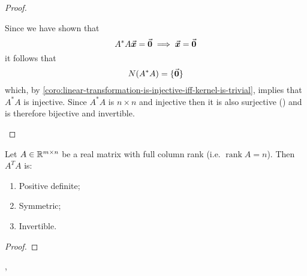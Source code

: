 \documentclass[../MathsNotesBase.tex]{subfiles}
\begin{document}
{\begin{proof}
\begin{enumerate}[label=(\roman*)]
{						
						Since we have shown that
						\[ A^* A \vec{\bm{x}} = \vec{\bm{0}} \implies \vec{\bm{x}} = \vec{\bm{0}} \]
						it follows that
						\[ N(A^* A) = \{\vec{\bm{0}}\} \]
						which, by \autoref{coro:linear-transformation-is-injective-iff-kernel-is-trivial}, implies that ${ A^* A }$ is injective. Since ${ A^* A }$ is ${ n \times n }$ and injective then it is also surjective () and is therefore bijective and invertible.
					}
				\end{enumerate}
			\end{proof}
			\begin{corollary}\label{coro:properties-of-real-full-column-rank-matrix-product-with-transpose}
				Let ${ A \in \mathbb{R}^{m \times n} }$ be a real matrix with full column rank (i.e. ${ \operatorname{rank} A = n }$). Then ${ A^T A }$ is:
				\begin{enumerate}[label=(\roman*)]
					\item{Positive definite;}
					\item{Symmetric;}
					\item{Invertible.}
				\end{enumerate}
			\end{corollary}
			\begin{proof}
			\end{proof}
			
			
			\sep
			\begin{exe}
				\label{ex:principal-minors-check-indeterminate-case}
			\end{exe}
		}
	
\end{document}

